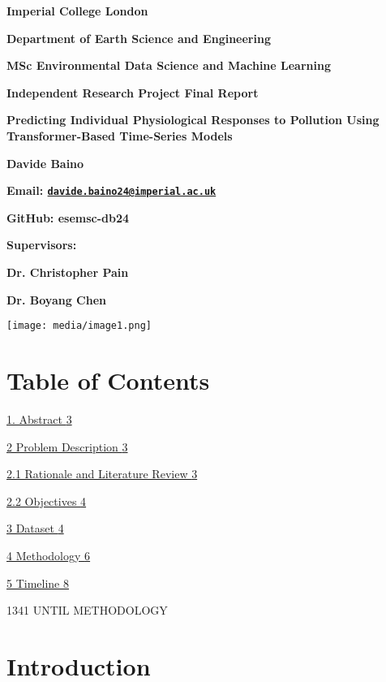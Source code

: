 \documentclass[
]{article}
\author{}
\date{}
\begin{document}
\textbf{Imperial College London}

\textbf{Department of Earth Science and Engineering}

\textbf{MSc Environmental Data Science and Machine Learning}

\textbf{Independent Research Project Final Report}

\textbf{Predicting Individual Physiological Responses to Pollution Using
Transformer-Based Time-Series Models}

\textbf{Davide Baino}

\textbf{Email:
\href{mailto:davide.baino24@imperial.ac.uk}{\nolinkurl{davide.baino24@imperial.ac.uk}}}

\textbf{GitHub: esemsc-db24}

\textbf{Supervisors:}

\textbf{Dr. Christopher Pain}

\textbf{Dr. Boyang Chen}

\texttt{[image: media/image1.png]}

\hypertarget{table-of-contents}{%
\section{Table of Contents}\label{table-of-contents}}

\protect\hyperlink{_Toc200353825}{1. Abstract
\protect\hyperlink{_Toc200353825}{3}}

\protect\hyperlink{problem-description}{2 Problem Description
\protect\hyperlink{problem-description}{3}}

\protect\hyperlink{rationale-and-literature-review}{2.1 Rationale and
Literature Review
\protect\hyperlink{rationale-and-literature-review}{3}}

\protect\hyperlink{objectives}{2.2 Objectives
\protect\hyperlink{objectives}{4}}

\protect\hyperlink{_Toc200353829}{3 Dataset
\protect\hyperlink{_Toc200353829}{4}}

\protect\hyperlink{methodology}{4 Methodology
\protect\hyperlink{methodology}{6}}

\protect\hyperlink{_Toc200353831}{5 Timeline
\protect\hyperlink{_Toc200353831}{8}}

\protect\hypertarget{_Toc200353825}{}{}1341 UNTIL METHODOLOGY

\hypertarget{introduction}{%
\section{Introduction}\label{introduction}}
\end{document}
